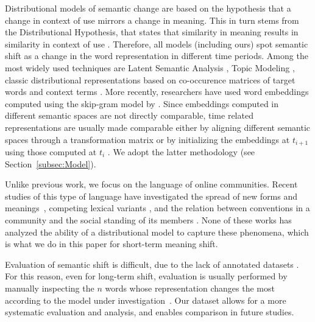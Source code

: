 Distributional models of semantic change are based on the hypothesis
that a change in context of use mirrors a change in meaning.
This in turn stems from the Distributional Hypothesis, that states
that similarity in meaning results in similarity in context of use \cite{harris1954distributional}.
Therefore, all models (including ours) spot semantic shift as a change in the word representation in different time periods.
Among the most widely used techniques are Latent Semantic Analysis \cite{sagi2011tracing,jatowt2014framework}, Topic Modeling \cite{wijaya2011understanding}, classic distributional representations based on co-occurence matrices of target words and context terms \cite{gulordava2011distributional}.
 More recently, researchers have used word embeddings computed using the skip-gram model by . Since embeddings computed in different semantic spaces are not directly comparable, time related representations are usually made comparable either by aligning different semantic spaces through a transformation matrix \cite{kulkarni2015statistically,azarbonyad2017words, hamilton2016diachronic} or by initializing the embeddings at $t_{i+1}$ using those computed at $t_i$ \cite{kim2014temporal,del2016tracing,phillips2017intrinsic,szymanski2017temporal}. We adopt the latter methodology (see Section~\ref{subsec:Model}). 

Unlike previous work, we focus on the language of online communities.
Recent studies of this type of language have investigated the spread of new forms and meanings~\cite{del2017semantic,del2018road,stewart2018making}, 
competing lexical variants \cite{rotabi2017competition}, and the relation between conventions in a community and 
the social standing of its members \cite{danescu2013no}. 
None of these works has analyzed the ability of a distributional model to capture these phenomena, 
which is what we do in this paper for short-term meaning shift. 

Evaluation of semantic shift is difficult, due to the lack of
annotated datasets \cite{frermann2016bayesian}. For this reason, even for long-term shift, evaluation is usually performed by manually
inspecting the $n$ words whose representation changes the most
according to the model under investigation~\cite{hamilton2016diachronic,kim2014temporal}.
Our dataset allows for a more systematic evaluation and analysis, and
enables comparison in future studies.

